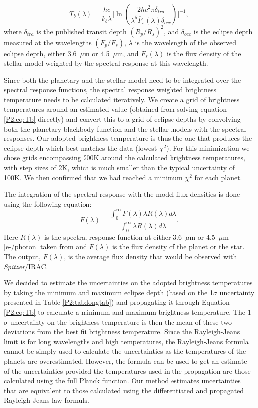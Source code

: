 \begin{equation}
    T_b (\lambda) = \frac{hc}{k_b\lambda} \Big[ \ln \left( \frac{2hc^2\pi \delta_{tra} }{\lambda^5 \overline{F}_{s}(\lambda) \delta_{occ} }   \right) \Big]^{-1},
    \label{P2:eq:Tb}
\end{equation}where $\delta_{tra}$ is the published transit depth $(R_p/R_s)^2$, and $\delta_{occ}$ is the eclipse depth measured at the \spitzer wavelengths $(F_p/F_s)$, $\lambda$ is the wavelength of the observed eclipse depth, either 3.6~$\mu$m or 4.5~$\mu$m, and $\overline{F}_{s}(\lambda)$ is the flux density of the stellar model weighted by the \spitzerIRAC spectral response at this wavelength.

Since both the planetary and the stellar model need to be integrated over the \spitzer spectral response functions, the spectral response weighted brightness temperature needs to be calculated iteratively. We create a grid of brightness temperatures around an estimated value (obtained from solving equation \ref{P2:eq:Tb} directly) and convert this to a grid of eclipse depths by convolving both the planetary blackbody function and the stellar models with the spectral responses. Our adopted brightness temperature is thus the one that produces the eclipse depth which best matches the data (lowest $\chi^2$). For this minimization we chose grids encompassing 200K around the calculated brightness temperatures, with step sizes of 2K, which is much smaller than the typical uncertainty of 100K. We then confirmed that we had reached a minimum $\chi^2$ for each planet.

The integration of the spectral response with the model flux densities is done using the following equation:
\begin{equation}
  \label{P2:eq:int}
    \overline{F}(\lambda) = \frac{\int_0^\infty  F(\lambda) \lambda R(\lambda) d\lambda}{\int_0^\infty  \lambda R(\lambda) d\lambda}
.\end{equation}Here $R(\lambda)$ is the spectral response function at either 3.6~$\mu$m or 4.5~$\mu$m [e-/photon] taken from \citet{Quijada2004} and $F(\lambda)$ is the flux density of the planet or the star. The output, $\overline{F}(\lambda)$, is the average flux density that would be observed with \textit{Spitzer}/IRAC.

We decided to estimate the uncertainties on the adopted brightness temperatures by taking the minimum and maximum eclipse depth (based on the 1$\sigma$ uncertainty presented in Table \ref{P2:tab:longtab}) and propagating it through Equation \ref{P2:eq:Tb} to calculate a minimum and maximum brightness temperature. The 1$\sigma$ uncertainty on the brightness temperature is then the mean of these two deviations from the best fit brightness temperature. Since the Rayleigh-Jeans limit is for long wavelengths and high temperatures, the Rayleigh-Jeans formula cannot be simply used to calculate the uncertainties as the temperatures of the planets are overestimated. However, the formula can be used to get an estimate of the uncertainties provided the temperatures used in the propagation are those calculated using the full Planck function. Our method  estimates uncertainties that are equivalent to those calculated using the differentiated and propagated Rayleigh-Jeans law formula.

